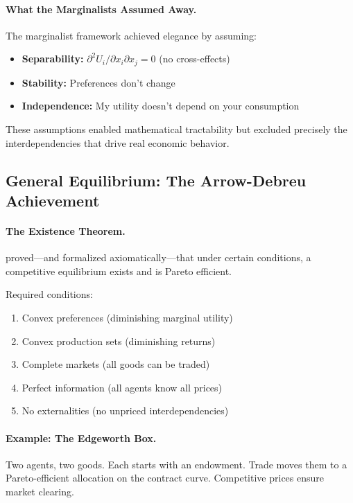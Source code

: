 \paragraph{What the Marginalists Assumed Away.}
The marginalist framework achieved elegance by assuming:
\begin{itemize}
  \item \textbf{Separability:} $\partial^2 U_i / \partial x_i \partial x_j = 0$ (no cross-effects)
  \item \textbf{Stability:} Preferences don't change
  \item \textbf{Independence:} My utility doesn't depend on your consumption
\end{itemize}

These assumptions enabled mathematical tractability but excluded precisely
the interdependencies that drive real economic behavior.

\subsection{General Equilibrium: The Arrow-Debreu Achievement}

\paragraph{The Existence Theorem.}
\citet{arrowdeb} proved---and \citet{debreu1959} formalized axiomatically---that under certain conditions,
a competitive equilibrium exists and is Pareto efficient.

Required conditions:
\begin{enumerate}
  \item Convex preferences (diminishing marginal utility)
  \item Convex production sets (diminishing returns)
  \item Complete markets (all goods can be traded)
  \item Perfect information (all agents know all prices)
  \item No externalities (no unpriced interdependencies)
\end{enumerate}

\paragraph{Example: The Edgeworth Box.}
Two agents, two goods. Each starts with an endowment.
Trade moves them to a Pareto-efficient allocation on the contract curve.
Competitive prices ensure market clearing.

